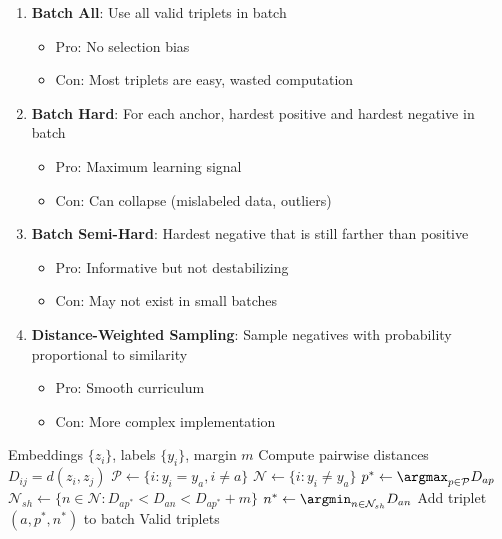 \begin{enumerate}
    \item \textbf{Batch All}: Use all valid triplets in batch
    \begin{itemize}
        \item Pro: No selection bias
        \item Con: Most triplets are easy, wasted computation
    \end{itemize}
    
    \item \textbf{Batch Hard}: For each anchor, hardest positive and hardest negative in batch
    \begin{itemize}
        \item Pro: Maximum learning signal
        \item Con: Can collapse (mislabeled data, outliers)
    \end{itemize}
    
    \item \textbf{Batch Semi-Hard}: Hardest negative that is still farther than positive
    \begin{itemize}
        \item Pro: Informative but not destabilizing
        \item Con: May not exist in small batches
    \end{itemize}
    
    \item \textbf{Distance-Weighted Sampling}: Sample negatives with probability proportional to similarity
    \begin{itemize}
        \item Pro: Smooth curriculum
        \item Con: More complex implementation
    \end{itemize}
\end{enumerate}

\begin{algorithm}[H]
\caption{Batch Semi-Hard Mining}
\begin{algorithmic}[1]
\REQUIRE Embeddings $\{z_i\}$, labels $\{y_i\}$, margin $m$
\STATE Compute pairwise distances $D_{ij} = d(z_i, z_j)$
    \STATE $\mathcal{P} \gets \{i : y_i = y_a, i \neq a\}$ 
    \STATE $\mathcal{N} \gets \{i : y_i \neq y_a\}$ 
    \STATE $p^* \gets \argmax_{p \in \mathcal{P}} D_{ap}$ 
    \STATE $\mathcal{N}_{sh} \gets \{n \in \mathcal{N} : D_{ap^*} < D_{an} < D_{ap^*} + m\}$ 
        \STATE $n^* \gets \argmin_{n \in \mathcal{N}_{sh}} D_{an}$ 
        \STATE Add triplet $(a, p^*, n^*)$ to batch
    \ENDIF
\ENDFOR
\RETURN Valid triplets
\end{algorithmic}
\end{algorithm}

